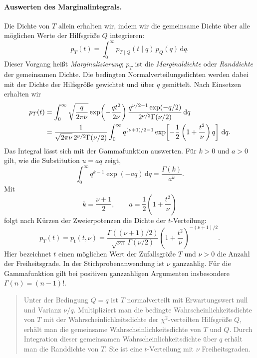 \paragraph{Auswerten des Marginalintegrals.}
Die Dichte von $T$ allein erhalten wir, indem wir die gemeinsame Dichte
über alle möglichen Werte der Hilfsgröße $Q$ integrieren:
\begin{equation}
  p_T(t)=\int_0^\infty
    p_{T\mid Q}(t\mid q)\,p_Q(q)\,\mathrm dq.
  \label{eq:t_marginalintegral}
\end{equation}
Dieser Vorgang heißt \textsl{Marginalisierung}; $p_T$ ist die
\textsl{Marginaldichte} oder \textsl{Randdichte} der gemeinsamen Dichte.
Die bedingten Normalverteilungsdichten werden dabei mit der Dichte der Hilfsgröße
gewichtet und über $q$ gemittelt. Nach Einsetzen erhalten wir
\begin{align}
  p_T(t)
  &=\int_0^\infty
    \sqrt{\frac{q}{2\pi\nu}}
    \exp\!\left(-\frac{qt^2}{2\nu}\right)
    \frac{q^{\nu/2-1}\exp(-q/2)}
         {2^{\nu/2}\Gamma(\nu/2)}\,\mathrm dq
    \notag\\
  &=\frac{1}{\sqrt{2\pi\nu}\,2^{\nu/2}\Gamma(\nu/2)}
    \int_0^\infty q^{(\nu+1)/2-1}
    \exp\!\left[-\frac{1}{2}
      \left(1+\frac{t^2}{\nu}\right)q\right]\,\mathrm dq.
  \label{eq:t_marginalintegral_eingesetzt}
\end{align}
Das Integral lässt sich mit der Gammafunktion auswerten. Für $k>0$
und $a>0$ gilt, wie die Substitution $u=aq$ zeigt,
\begin{equation}
  \int_0^\infty q^{k-1}\exp(-aq)\,\mathrm dq
  =\frac{\Gamma(k)}{a^k}.
  \label{eq:t_gammaintegral}
\end{equation}
Mit
\[
  k=\frac{\nu+1}{2},
  \qquad a=\frac{1}{2}\left(1+\frac{t^2}{\nu}\right)
\]
folgt nach Kürzen der Zweierpotenzen die Dichte der $t$-Verteilung:
\begin{equation}
  \boxed{
  p_T(t)=p_{\mathrm t}(t,\nu)
  =\frac{\Gamma\!\left((\nu+1)/2\right)}
         {\sqrt{\nu\pi}\,\Gamma(\nu/2)}
    \left(1+\frac{t^2}{\nu}\right)^{-(\nu+1)/2}.}
  \label{eq:t_dichte_marginal}
\end{equation}
Hier bezeichnet $t$ einen möglichen Wert der Zufallsgröße $T$ und
$\nu>0$ die Anzahl der Freiheitsgrade. In der Stichprobenanwendung ist
$\nu$ ganzzahlig. Für die Gammafunktion gilt bei positiven ganzzahligen
Argumenten insbesondere $\Gamma(n)=(n-1)!$.

\begin{quote}
Unter der Bedingung $Q=q$ ist $T$ normalverteilt mit Erwartungswert null und Varianz $\nu/q$. Multipliziert man die bedingte Wahrscheinlichkeitsdichte von $T$ mit der Wahrscheinlichkeitsdichte der $\chi^2$-verteilten Hilfsgröße $Q$, erhält man die gemeinsame Wahrscheinlichkeitsdichte von $T$ und $Q$. Durch Integration dieser gemeinsamen Wahrscheinlichkeitsdichte über $q$ erhält man die Randdichte von $T$. Sie ist eine $t$-Verteilung mit $\nu$ Freiheitsgraden.
\end{quote}

